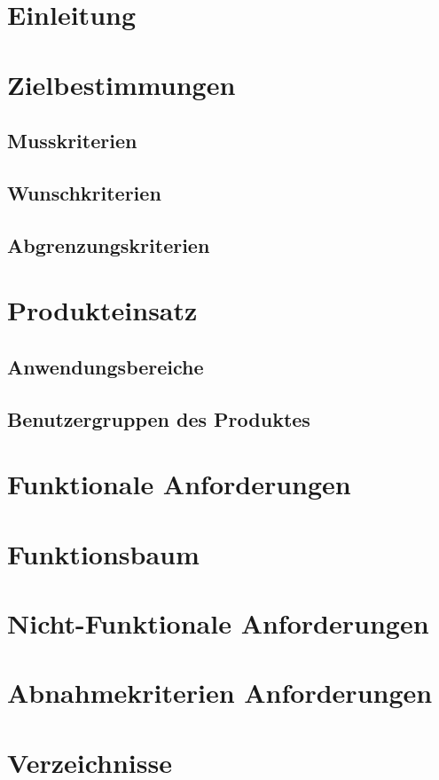 \documentclass[10pt,a4paper,titlepage,twoside,german]{zhawreprt}
\begin{document}
\maketitle
\tableofcontents
\chapter{Einleitung}\label{chp:Introduction}
\chapter{Zielbestimmungen}\label{chp:DefinitionOfGoals}
\section{Musskriterien}\label{sec:MustCriteria}
\section{Wunschkriterien}\label{sec:WishCriteria}
\section{Abgrenzungskriterien}\label{sec:DistinctionCriteria}
\chapter{Produkteinsatz}\label{chp:ProductApplication}
\section{Anwendungsbereiche}\label{sec:FieldOfApplience}
\section{Benutzergruppen des Produktes}\label{sec:TargetAudience}
\chapter{Funktionale Anforderungen}\label{chp:FunctionalRequirements}
\chapter{Funktionsbaum}\label{chp:FunctionTree}
\chapter{Nicht-Funktionale Anforderungen}\label{chp:NonFunctionalRequirements}
\chapter{Abnahmekriterien Anforderungen}\label{chp:TestRequirements}
\chapter{Verzeichnisse}\label{chp:Index}
\printglossary\label{sec:Glossar}
\newpage
\label{sec:Bibliography}
\end{document}
